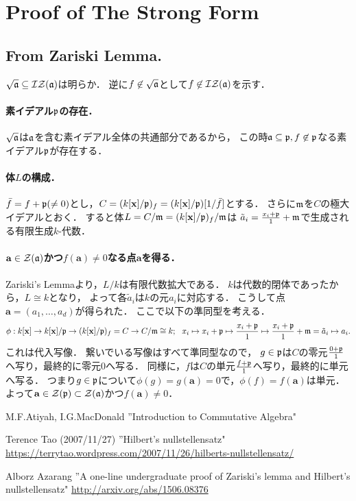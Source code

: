 \documentclass[a4paper]{jsarticle}
\newcommand{\kx}{k[\mathbf{x}]}
\begin{document}
\section{Proof of The Strong Form}
    \subsection{From Zariski Lemma.}
    $\sqrt{\mathfrak{a}} \subseteq \mathcal{I} \mathcal{Z} (\mathfrak{a})$は明らか．
    逆に$f \not \in \sqrt{\mathfrak{a}}$として$f \not \in \mathcal{I} \mathcal{Z} (\mathfrak{a})$を示す．

    \paragraph{素イデアル$\mathfrak{p}$の存在．}
    $\sqrt{\mathfrak{a}}$は$\mathfrak{a}$を含む素イデアル全体の共通部分であるから，
    この時$\mathfrak{a} \subseteq \mathfrak{p}, f \not \in \mathfrak{p}$なる素イデアル$\mathfrak{p}$が存在する．

    \paragraph{体$L$の構成．}
    $\bar{f}=f+\mathfrak{p} (\neq 0)$とし，$C=(\kx/\I{p})_f=(\kx/\I{p})[1/\bar{f}]$とする．
    さらに$\mathfrak{m}$を$C$の極大イデアルとおく．
    すると体$L=C/\I{m}=(\kx/\I{p})_f/\I{m}$は
    $\tilde{a}_i=\frac{x_i+\mathfrak{p}}{1}+\mathfrak{m}$で生成される有限生成$k$-代数．

    \paragraph{$\mathbf{a} \in \mathcal{Z}(\mathfrak{a})$かつ$f(\mathbf{a}) \neq 0$なる点$\mathbf{a}$を得る．}
    Zariski's Lemmaより，$L/k$は有限代数拡大である．
    $k$は代数的閉体であったから，$L \cong k$となり，
    よって各$\tilde{a}_i$は$k$の元$a_i$に対応する．
    こうして点$\mathbf{a}=(a_1,\dots,a_d)$が得られた．
    ここで以下の準同型を考える．
    \[
        \phi: \kx \to \kx/\I{p} \to (\kx/\I{p})_f=C \to C/\I{m} \cong k;
    ~~ x_i \mapsto x_i+\I{p} \mapsto \frac{x_i+\I{p}}{1} \mapsto \frac{x_i+\I{p}}{1}+\I{m}=\tilde{a}_i \mapsto a_i.
    \]
    これは代入写像．
    繋いでいる写像はすべて準同型なので，
    $g \in \mathfrak{p}$は$C$の零元$\frac{0+\mathfrak{p}}{1}$へ写り，最終的に零元$0$へ写る．
    同様に，$f$は$C$の単元$\frac{f+\mathfrak{p}}{1}$へ写り，最終的に単元へ写る．
    つまり$g \in \mathfrak{p}$について$\phi(g)=g(\mathbf{a})=0$で，$\phi(f)=f(\mathbf{a})$は単元．
    よって$\mathbf{a} \in \mathcal{Z}(\mathfrak{p}) \subset \mathcal{Z}(\mathfrak{a})$かつ$f(\mathbf{a}) \neq 0$．

\begin{thebibliography}{9}
        M.F.Atiyah, I.G.MacDonald
        ''Introduction to Commutative Algebra"

        Terence Tao (2007/11/27)
        ''Hilbert’s nullstellensatz"
        \url{https://terrytao.wordpress.com/2007/11/26/hilberts-nullstellensatz/}

        Alborz Azarang
        ''A one-line undergraduate proof of Zariski's lemma and Hilbert's nullstellensatz"
        \url{http://arxiv.org/abs/1506.08376}
\end{thebibliography}
\end{document}
